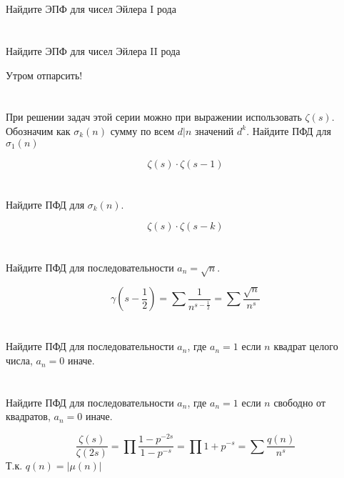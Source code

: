 \section{}
Найдите ЭПФ для чисел Эйлера I рода


\section{}
Найдите ЭПФ для чисел Эйлера II рода

Утром отпарсить!

\section{}
При решении задач этой серии можно при выражении использовать $\zeta(s)$. Обозначим как $\sigma_k(n)$ сумму по всем $d|n$ значений $d^k$. Найдите ПФД для $\sigma_1(n)$

\[\zeta(s) \cdot \zeta(s - 1)\]

\section{}
Найдите ПФД для $\sigma_k(n)$.

\[\zeta(s) \cdot \zeta(s - k)\]

\section{}
Найдите ПФД для последовательности $a_n = \sqrt{n}$.

\[\gamma(s - \frac{1}{2}) = \sum \frac{1}{n^{s - \frac{1}{2}}} = \sum \frac{\sqrt{n}}{n^s}\]

\section{}
Найдите ПФД для последовательности $a_n$, где $a_n = 1$ если $n$ квадрат целого числа, $a_n = 0$ иначе.

\section{}
Найдите ПФД для последовательности $a_n$, где $a_n = 1$ если $n$ свободно от квадратов, $a_n = 0$ иначе.

\[\frac{\zeta(s)}{\zeta(2s)} = \prod \frac{1 - p^{ - 2s}}{1 - p^{ - s}} = \prod 1 + p^{ - s} = \sum \frac{q(n)}{n^s}  \]
Т.к. \(q(n) = |\mu(n)|\)

